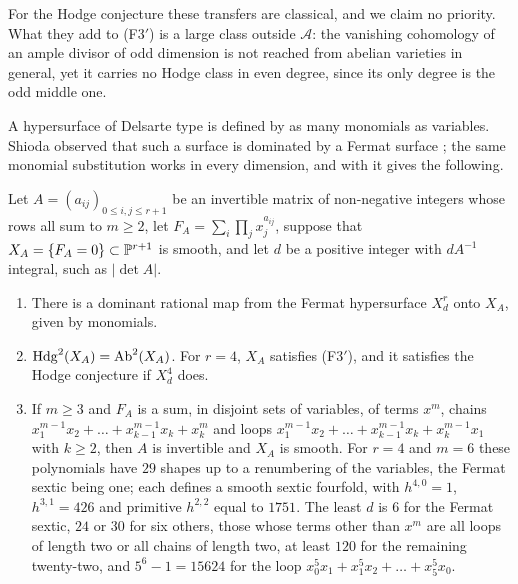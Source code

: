 For the Hodge conjecture these transfers are classical, and we claim no
priority. What they add to \textup{(F3$'$)} is a large class outside
$\mathcal{A}$: the vanishing cohomology of an ample divisor of odd dimension
is not reached from abelian varieties in general, yet it carries no Hodge
class in even degree, since its only degree is the odd middle one.

A hypersurface of Delsarte type is defined by as many monomials as
variables. Shioda observed that such a surface is dominated by a Fermat
surface \cite{Shi86}; the same monomial substitution works in every
dimension, and with  it gives the following.

\begin{proposition}\label{prop:delsarte}
Let $A=(a_{ij})_{0\le i,j\le r+1}$ be an invertible matrix of non-negative
integers whose rows all sum to $m\ge2$, let $F_{A}=\sum_{i}\prod_{j}
x_{j}^{a_{ij}}$, suppose that $X_{A}=\{F_{A}=0\}\subset\mathbb{P}^{r+1}$ is smooth,
and let $d$ be a positive integer with $dA^{-1}$ integral, such as
$|\det A|$.
\begin{enumerate}[label=\textup{(\roman*)},leftmargin=2.6em,itemsep=2pt]
\item There is a dominant rational map from the Fermat hypersurface
  $X^{r}_{d}$ onto $X_{A}$, given by monomials.
\item $\mathrm{Hdg}^{2}(X_{A})=\mathrm{Ab}^{2}(X_{A})$. For $r=4$, $X_{A}$
  satisfies \textup{(F3$'$)}, and it satisfies the Hodge conjecture if
  $X^{4}_{d}$ does.
\item If $m\ge3$ and $F_{A}$ is a sum, in disjoint sets of variables, of
  terms $x^{m}$, chains $x_{1}^{m-1}x_{2}+\dots+x_{k-1}^{m-1}x_{k}+x_{k}^{m}$
  and loops $x_{1}^{m-1}x_{2}+\dots+x_{k-1}^{m-1}x_{k}+x_{k}^{m-1}x_{1}$
  with $k\ge2$, then $A$ is invertible and $X_{A}$ is smooth. For $r=4$ and
  $m=6$ these polynomials have $29$ shapes up to a renumbering of the
  variables, the Fermat sextic being one; each defines a smooth sextic
  fourfold, with $h^{4,0}=1$, $h^{3,1}=426$ and primitive $h^{2,2}$ equal
  to $1751$. The least $d$ is $6$ for the Fermat sextic, $24$ or $30$ for
  six others, those whose terms other than $x^{m}$ are all loops of length
  two or all chains of length two, at least $120$ for the remaining
  twenty-two, and $5^{6}-1=15624$ for the loop
  $x_{0}^{5}x_{1}+x_{1}^{5}x_{2}+\dots+x_{5}^{5}x_{0}$.
\end{enumerate}
\end{proposition}

